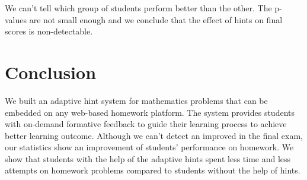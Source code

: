 \documentclass{sigchi}
\begin{document}
We can't tell which group of students perform better than the other. The p-values are not small enough and we conclude that the effect of hints on final scores is non-detectable.


\section{Conclusion}
We built an adaptive hint system for mathematics problems that can be embedded on any web-based homework platform. The system provides students with on-demand formative feedback to guide their learning process to achieve better learning outcome. Although we can't detect an improved in the final exam, our statistics show an improvement of students' performance on homework. We show that students with the help of the adaptive hints spent less time and less attempts on homework problems compared to students without the help of hints.

\balance{}

%


\end{document}
